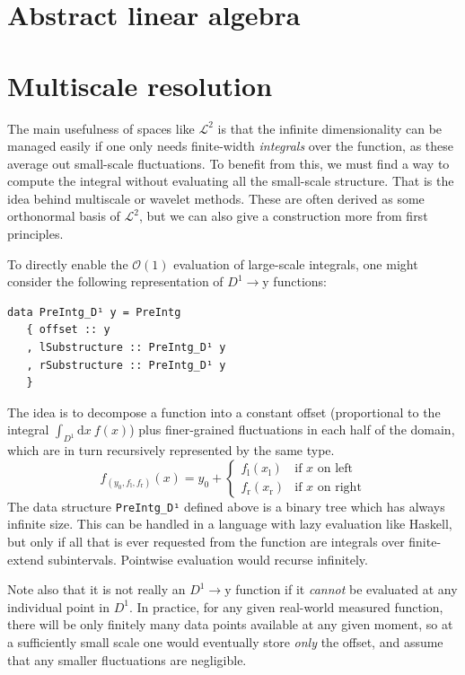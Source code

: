 \documentclass[sigplan,review,anonymous]{acmart}\settopmatter{printfolios=true,printccs=false,printacmref=false}
\theoremstyle{acmplain}
\theoremstyle{acmdefinition}
\begin{document}
\section{Abstract linear algebra}

\section{Multiscale resolution}\label{mulScaleResoIntro}
The main usefulness of spaces like $\mathcal{L}^2$ is that the infinite dimensionality can be managed easily if one only needs finite-width \emph{integrals} over the function, as these average out small-scale fluctuations.
To benefit from this, we must find a way to compute the integral without evaluating all the small-scale structure.
That is the idea behind multiscale or wavelet methods.
These are often derived as some orthonormal basis of $\mathcal{L}^2$, but we can also give a construction more from first principles.

To directly enable the $\mathcal{O}(1)$ evaluation of large-scale integrals, one might consider the following representation of $D^1\to \mathrm{y}$ functions:
\begin{lstlisting}
data PreIntg_D¹ y = PreIntg
   { offset :: y
   , lSubstructure :: PreIntg_D¹ y
   , rSubstructure :: PreIntg_D¹ y
   }
\end{lstlisting}
The idea is to decompose a function into a constant offset (proportional to the integral $\int_{D^1}\!\mathrm{d}x\:f(x)$) plus finer-grained fluctuations in each half of the domain, which are in turn recursively represented by the same type.
\[
  f_{(y_0,f_\mathrm{l},f_\mathrm{r})}(x)
      = y_0 + \begin{cases}
                 f_\mathrm{l}(x_\mathrm{l}) & \text{if $x$ on left}
              \\ f_\mathrm{r}(x_\mathrm{r}) & \text{if $x$ on right}
              \end{cases}
\]
The data structure \lstinline`PreIntg_D¹` defined above is a binary tree which has always infinite size.
This can be handled in a language with lazy evaluation like Haskell,
but only if all that is ever requested from the function are integrals over finite-extend subintervals.
Pointwise evaluation would recurse infinitely.

Note also that it is not really an $D^1\to \mathrm{y}$ function if it \emph{cannot} be evaluated at any individual point in $D^1$.
In practice, for any given real-world measured function, there will be only finitely many data points available at any given moment,
so at a sufficiently small scale one would eventually store \emph{only} the offset,
and assume that any smaller fluctuations are negligible.
\end{document}
